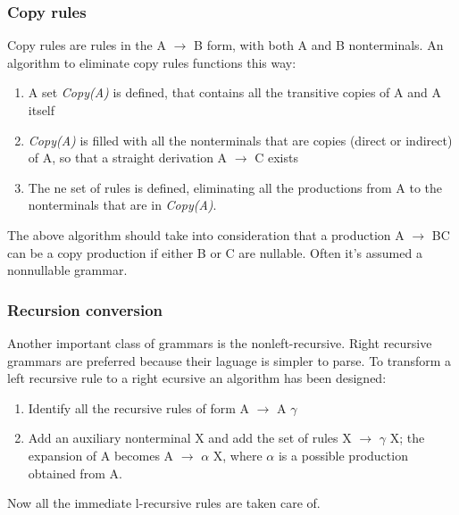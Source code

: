 \documentclass[10pt,a4paper]{article}
\begin{document}
			\subsubsection{Copy rules}
				Copy rules are rules in the A $\rightarrow$ B form, with both A and B nonterminals. An algorithm to eliminate copy rules functions this way:
				\begin{enumerate}
					\item A set \emph{Copy(A)} is defined, that contains all the transitive copies of A and A itself
					\item \emph{Copy(A)} is filled with all the nonterminals that are copies (direct or indirect) of A, so that a straight derivation A $\rightarrow$ C exists
					\item The ne set of rules is defined, eliminating all the productions from A to the nonterminals that are in \emph{Copy(A)}.  
				\end{enumerate}
				The above algorithm should take into consideration that a production A $\rightarrow$ BC can be a copy production if either B or C are nullable. Often it's assumed a nonnullable grammar.
			\subsubsection{Recursion conversion}
				Another important class of grammars is the nonleft-recursive. Right recursive grammars are preferred because their laguage is simpler to parse. To transform a left recursive rule to a right ecursive an algorithm has been designed:
				\begin{enumerate}
					\item Identify all the recursive rules of form A $\rightarrow$ A $\gamma$
					\item Add an auxiliary nonterminal X and add the set of rules X $\rightarrow$ $\gamma$ X; the expansion of A becomes A $\rightarrow$ $\alpha$ X, where $\alpha$ is a possible production obtained from A.
				\end{enumerate}
				Now all the immediate l-recursive rules are taken care of.\\
\end{document}
